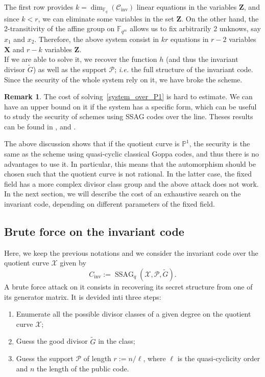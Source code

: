 \documentclass[10pt]{article}
\theoremstyle{definition}
\newtheorem{rq1}[thm]{Remark}
\theoremstyle{definition}
\theoremstyle{definition}
\newcommand{\PP}{\mathbb{P}}
\newcommand{\Fqm}{\mathbb{F}_{q^m}}
\newcommand{\Fq}{\mathbb{F}_q}
\newcommand{\X}{\mathcal{X}}
\newcommand{\PR}{\mathcal{P}}
\newcommand{\ssag}{\operatorname{SSAG}}
\begin{document}
 The first row provides $k=\dim_{\Fq}(\mathcal{C}_{\mathrm{inv}})$ linear equations in the variables $\mathbf{Z}$, and since $k < r$, we can eliminate some variables in the set $\mathbf{Z}$. On the other hand, the 2-transitivity of the affine group on $\Fqm$ allows us to fix arbitrarily 2 unknows, say $x_1$ and $x_2$. Therefore, the above system consist in $kr$ equations in $r-2$ variables $\mathbf{X}$ and $r-k$ variables $\mathbf{Z}$. \\
If we are able to solve it, we recover the function $h$ (and thus the invariant divisor $\tilde{G}$) as well as the support $\PR$; \textit{i.e.} the full structure of the invariant code. Since the security of the whole system rely on it, we have broke the scheme.  

\begin{rq1} 
The cost of solving~\eqref{system_over_P1} is hard to estimate. We can have an upper bound on it if the system has a specific form, which can be useful to study the security of schemes using SSAG codes over the line. Theses results can be found in \cite{FOP}, \cite{FOP1} and \cite{FOP2}. 
\end{rq1}

The above discussion shows that if the quotient curve is $\PP^1$, the security is the same as the scheme using quasi-cyclic classical Goppa codes, and thus there is no advantages to use it. In particular, this means that the automorphism should be chosen such that the quotient curve is not rational. In the latter case, the fixed field has a more complex divisor class group and the above attack does not work. In the next section, we will describe the cost of an exhaustive search on the invariant code, depending on different parameters of the fixed field. 


\subsection{Brute force on the invariant code} \label{bruteforce}


Here, we keep the previous notations and we consider the invariant code over the quotient curve $\X$ given by
\[C_{\mathrm{inv}} := \ssag_q(\X,\PR,\tilde{G}).\]
A brute force attack on it consists in recovering its secret structure from one of its generator matrix. It is devided inti three steps:
\begin{enumerate}
\item Enumerate all the possible divisor classes of a given degree on the quotient curve $\X$;
\item Guess the good divisor $\tilde{G}$ in the class;
\item Guess the support $\PR$ of length $r:=n/\ell$, where $\ell$ is the quasi-cyclicity order and $n$ the length of the public code.
\end{enumerate}
\end{document}
